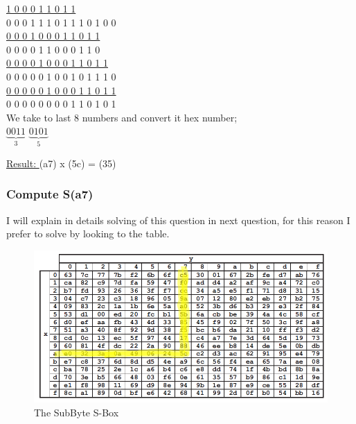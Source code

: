 \documentclass[11pt]{article}
\begin{document}
\underline{1 0 0 0 1 1 0 1 1} \\

0 0 0 1 1 1 0 1 1 1 0 1 0 0 \\

\underline{0 0 0 1 0 0 0 1 1 0 1 1} \\

0 0 0 0 1 1 0 0 0 1 1 0 \\

\underline{0 0 0 0 1 0 0 0 1 1 0 1 1 }\\

0 0 0 0 0 1 0 0 1 0 1 1 1 0\\

\underline{0 0 0 0 0 1 0 0 0 1 1 0 1 1}\\

0 0 0 0 0 0 0 0 1 1 0 1 0 1\\

We take to last 8 numbers and convert it hex number;\\

$\underbrace{0 0 1 1}_\text{3}$ $\underbrace{ 0 1 0 1}_\text{5} $


\underline{Result: }(a7) x (5c) = (35)\\


\subsubsection{Compute S(a7)}

I will explain in details solving of this question in  next question, for this reason I prefer to solve by looking to the table. \\

\begin{figure}[!h]
  \centering
  \includegraphics[width=1\textwidth]{Screenshot_6.png}
  \caption{The SubByte S-Box}
  \label{fig:The SubByte S-Box}
\end{figure}
\end{document}
